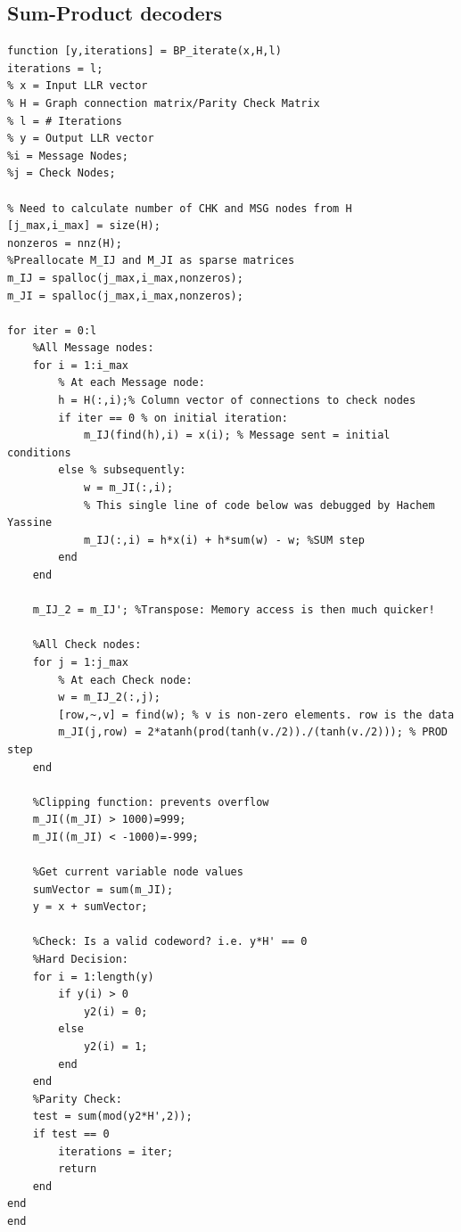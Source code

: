 \documentclass[11pt]{article}
\numberwithin{equation}{subsection}
\begin{document}
\subsection*{Sum-Product decoders}
\singlespacing
\begin{lstlisting}[style=Matlab-editor,caption = {Sum-Product decoder, first version},label=code:sp1]
function [y,iterations] = BP_iterate(x,H,l)
iterations = l;
% x = Input LLR vector
% H = Graph connection matrix/Parity Check Matrix
% l = # Iterations
% y = Output LLR vector
%i = Message Nodes;
%j = Check Nodes;

% Need to calculate number of CHK and MSG nodes from H
[j_max,i_max] = size(H);
nonzeros = nnz(H);
%Preallocate M_IJ and M_JI as sparse matrices
m_IJ = spalloc(j_max,i_max,nonzeros);
m_JI = spalloc(j_max,i_max,nonzeros);

for iter = 0:l
    %All Message nodes:
    for i = 1:i_max
        % At each Message node:
        h = H(:,i);% Column vector of connections to check nodes
        if iter == 0 % on initial iteration:
            m_IJ(find(h),i) = x(i); % Message sent = initial conditions
        else % subsequently:
            w = m_JI(:,i);
            % This single line of code below was debugged by Hachem Yassine
            m_IJ(:,i) = h*x(i) + h*sum(w) - w; %SUM step
        end
    end
    
    m_IJ_2 = m_IJ'; %Transpose: Memory access is then much quicker!
    
    %All Check nodes:
    for j = 1:j_max
        % At each Check node:
        w = m_IJ_2(:,j);
        [row,~,v] = find(w); % v is non-zero elements. row is the data
        m_JI(j,row) = 2*atanh(prod(tanh(v./2))./(tanh(v./2))); % PROD step
    end
    
    %Clipping function: prevents overflow
    m_JI((m_JI) > 1000)=999;
    m_JI((m_JI) < -1000)=-999;
    
    %Get current variable node values
    sumVector = sum(m_JI);
    y = x + sumVector;
    
    %Check: Is a valid codeword? i.e. y*H' == 0
    %Hard Decision:
    for i = 1:length(y)
        if y(i) > 0
            y2(i) = 0;
        else
            y2(i) = 1;
        end
    end
    %Parity Check:
    test = sum(mod(y2*H',2));
    if test == 0
        iterations = iter;
        return
    end
end
end
\end{lstlisting}
\end{document}
